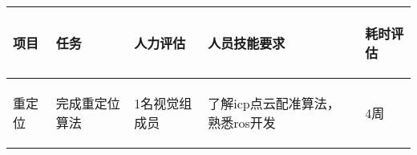 
\begin{longtable}{ p{2cm} | p{3cm} | p{3cm} | p{4.8cm} | p{2cm} |}

    \hline

    \endfoot
    
    \rowcolor{tabhdcolor}

        \begin{center}
            项目
        \end{center}  &
        \begin{center}
            任务
        \end{center}  &
        \begin{center}
           人力评估
        \end{center} &
        \begin{center}
            人员技能要求
        \end{center}  &
        \begin{center}
            耗时评估
        \end{center}  \\ 
        
    \hline

    \endhead

        \begin{center}
            重定位
        \end{center} &
        \begin{center}
            完成重定位算法
        \end{center} &
        \begin{center}
            1名视觉组成员
        \end{center} &
        \begin{center}
            了解icp点云配准算法，熟悉ros开发
        \end{center} &
        \begin{center}
            4周
        \end{center}\\
        

\end{longtable}
